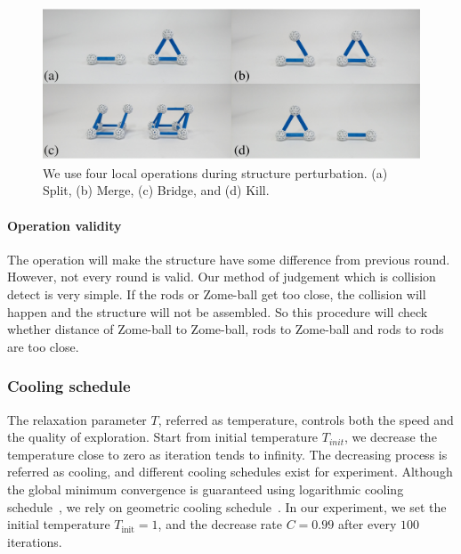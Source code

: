 \begin{figure}[ht]
\centering
\includegraphics[width=1.0\linewidth]{figs/local_opt.pdf} 
\caption{We use four local operations during structure perturbation. (a) Split, (b) Merge, (c) Bridge, and (d) Kill.}
\label{fig:local_op}
\end{figure}

\paragraph{Operation validity}
The operation will make the structure have some difference from  previous round. However, not every round is valid. Our method of judgement which is collision detect is very simple. If the rods or Zome-ball get too close, the collision will happen and the structure will not be assembled. So this procedure will check whether  distance of Zome-ball to Zome-ball, rods to Zome-ball and rods to rods are too close.

\subsubsection{Cooling schedule}
The relaxation parameter $T$, referred as temperature, controls both the speed and the quality of exploration.
Start from  initial temperature $T_{init}$, we decrease the temperature close to zero as iteration tends to infinity.
The decreasing process is referred as cooling, and different cooling schedules  exist for experiment.
Although the global minimum convergence is guaranteed using logarithmic cooling schedule~\cite{Salamon:2002:SA}, we rely on geometric cooling schedule~\cite{Henderson:2003:SA}. 
In our experiment, we set the initial temperature $T_\text{init} = 1$, and the decrease rate $C=0.99$ after every $100$ iterations.